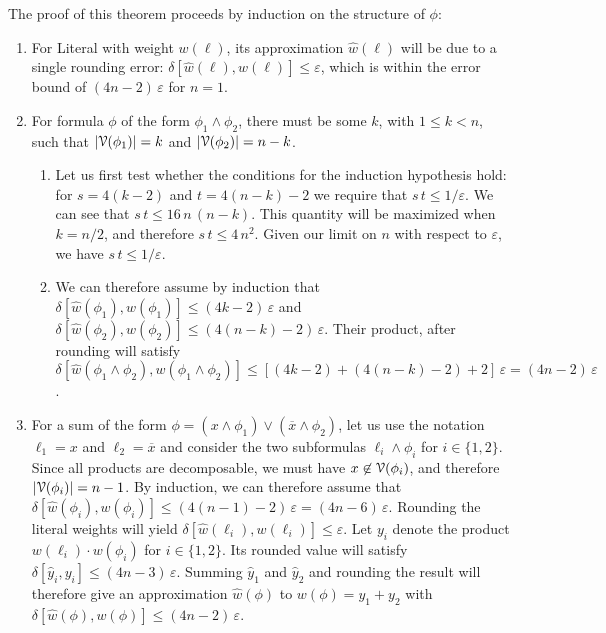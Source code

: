 \documentclass[letterpaper,USenglish,cleveref, autoref, thm-restate]{lipics-v2021}
\newcommand{\obar}[1]{\overline{#1}}
\newcommand{\lit}{\ell}
\newcommand{\approximate}[1]{\hat{#1}}
\newcommand{\approxy}{\approximate{y}}
\newcommand{\approxw}{\approximate{w}}
\newcommand{\aerror}{\delta}
\newcommand{\roundepsilon}{\varepsilon}
\newcommand{\dependencyset}{{\cal V}}
\begin{document}
The proof of this theorem proceeds by induction on the structure of $\phi$:
\begin{enumerate}
\item For Literal with weight $w(\lit)$, its approximation $\approxw(\lit)$ will be due to a single rounding error:
$\aerror[\approxw(\lit), w(\lit)] \leq \roundepsilon$, which is within the error bound of $(4n-2)\,\roundepsilon$ for $n=1$.
\item For formula $\phi$ of the form $\phi_1 \land \phi_2$, there must be some $k$, with $1 \leq k < n$, such that $|\dependencyset(\phi_1)| = k$
  and $|\dependencyset(\phi_2)| = n-k$.
\begin{enumerate}
  \item Let us first test whether the conditions for the induction hypothesis hold: for $s = 4(k-2)$ and $t = 4(n-k)-2$
    we require that $s\,t \leq 1/\roundepsilon$.  We can see that $s\,t \leq 16\,n\,(n-k)$. This quantity will be maximized when $k = n/2$, and therefore $s \, t \leq 4\,n^2$.
    Given our limit on $n$ with respect to $\roundepsilon$, we have $s \, t \leq 1/\roundepsilon$.
  \item
We can therefore assume by induction that 
 $\aerror[\approxw(\phi_1), w(\phi_1)] \leq (4 k-2) \,\roundepsilon$
  and $\aerror[\approxw(\phi_2), w(\phi_2)] \leq (4 (n-k)-2) \,\roundepsilon$.  Their product, after rounding
  will satisfy 
$\aerror[\approxw(\phi_1 \land \phi_2), w(\phi_1 \land \phi_2)] \leq [(4 k -2) + (4 (n-k) -2) + 2]\,\roundepsilon = (4n-2) \,\roundepsilon$.
\end{enumerate}
\item For a sum of the form
  $\phi = (x \land \phi_1) \lor (\obar{x} \land \phi_2)$, let us use the notation $\lit_1 = x$ and $\lit_2 = \obar{x}$
  and consider the two subformulas $\lit_i \land \phi_i$ for $i \in \{1,2\}$.
  Since all products are decomposable, we must have $x \not \in \dependencyset(\phi_i)$,
  and therefore $|\dependencyset(\phi_i)| = n-1$.
  By induction, we can therefore assume that
  $\aerror[\approxw(\phi_i), w(\phi_i)] \leq (4(n-1)-2) \,\roundepsilon = (4n-6)\,\roundepsilon$.  Rounding the literal weights will yield
  $\aerror[\approxw(\lit_i), w(\lit_i)] \leq \roundepsilon$.  Let $y_i$ denote the product $w(\lit_i) \cdot w(\phi_i)$ for $i \in \{1,2\}$.
  Its rounded value will satisfy
  $\aerror[\approxy_i, y_i] \leq (4n-3) \,\roundepsilon$.  Summing $\approxy_1$ and $\approxy_2$ and rounding the result will therefore give
  an approximation $\approxw(\phi)$ to $w(\phi) = y_1 + y_2$ with
$\aerror[\approxw(\phi), w(\phi)] \leq (4n-2)\,\roundepsilon$.  
\end{enumerate}
\end{document}
